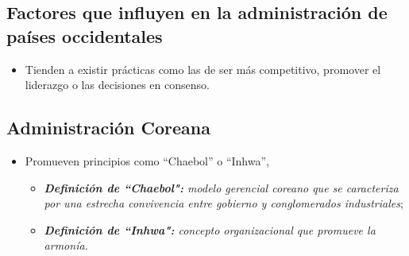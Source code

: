 \documentclass{article}
\begin{document}
\subsection{Factores que influyen en la administración de países occidentales}
\begin{itemize}
    \item Tienden a existir prácticas como las de ser más competitivo, promover el liderazgo o las decisiones en consenso.
\end{itemize}

\subsection{Administración Coreana}
\begin{itemize}
    \item Promueven principios como ``Chaebol'' o ``Inhwa'', 
    \begin{itemize}
        \item \emph{\textbf{Definición de ``Chaebol":} modelo gerencial coreano que se caracteriza por una estrecha convivencia entre gobierno y conglomerados industriales}; 
        \item \emph{\textbf{Definición de ``Inhwa":} concepto organizacional que promueve la armonía.}
    \end{itemize}
\end{itemize}


\end{document}
